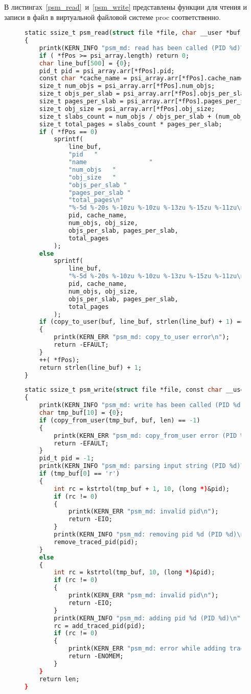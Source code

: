 В листингах~\ref{psm_read}~и~\ref{psm_write} представлены функции для чтения и записи в файл в виртуальной файловой системе proc соответственно.
\begin{figure}[H]
	\begin{lstlisting}[label=psm_read,caption=Функция psm\_read,language=Caml]
static ssize_t psm_read(struct file *file, char __user *buf, size_t len, loff_t *fPos)
{
	printk(KERN_INFO "psm_md: read has been called (PID %d)\n", current->pid);
	if ( *fPos >= psi_array.length) return 0;
	char line_buf[500] = {0};
	pid_t pid = psi_array.arr[*fPos].pid;
	const char *cache_name = psi_array.arr[*fPos].cache_name;
	size_t num_objs = psi_array.arr[*fPos].num_objs;
	size_t objs_per_slab = psi_array.arr[*fPos].objs_per_slab;
	size_t pages_per_slab = psi_array.arr[*fPos].pages_per_slab;
	size_t obj_size = psi_array.arr[*fPos].obj_size;
	size_t slabs_count = num_objs / objs_per_slab + (num_objs % objs_per_slab > 0);
	size_t total_pages = slabs_count * pages_per_slab;
	if ( *fPos == 0)
		sprintf(
			line_buf,
			"pid   "
			"name                 "
			"num_objs   "
			"obj_size   "
			"objs_per_slab "
			"pages_per_slab "
			"total_pages\n"
			"%-5d %-20s %-10zu %-10zu %-13zu %-15zu %-11zu\n",
			pid, cache_name,
			num_objs, obj_size,
			objs_per_slab, pages_per_slab,
			total_pages
		);
	else
		sprintf(
			line_buf,
			"%-5d %-20s %-10zu %-10zu %-13zu %-15zu %-11zu\n",
			pid, cache_name,
			num_objs, obj_size,
			objs_per_slab, pages_per_slab,
			total_pages
		);
	if (copy_to_user(buf, line_buf, strlen(line_buf) + 1) == -1)
	{
		printk(KERN_ERR "psm_md: copy_to_user error\n");
		return -EFAULT;
	}
	++( *fPos);
	return strlen(line_buf) + 1;
}
	\end{lstlisting}
\end{figure}
\begin{figure}[H]
	\begin{lstlisting}[label=psm_write,caption=Функция psm\_write,language=Caml]
static ssize_t psm_write(struct file *file, const char __user *buf, size_t len, loff_t *fPos)
{
	printk(KERN_INFO "psm_md: write has been called (PID %d)\n", current->pid);
	char tmp_buf[10] = {0};
	if (copy_from_user(tmp_buf, buf, len) == -1)
	{
		printk(KERN_ERR "psm_md: copy_from_user error (PID %d)\n", current->pid);
		return -EFAULT;
	}
	pid_t pid = -1;
	printk(KERN_INFO "psm_md: parsing input string (PID %d)\n", current->pid);
	if (tmp_buf[0] == 'r')
	{
		int rc = kstrtol(tmp_buf + 1, 10, (long *)&pid);
		if (rc != 0)
		{
			printk(KERN_ERR "psm_md: invalid pid\n");
			return -EIO;
		}
		printk(KERN_INFO "psm_md: removing pid %d (PID %d)\n", pid, current->pid);
		remove_traced_pid(pid);
	}
	else
	{
		int rc = kstrtol(tmp_buf, 10, (long *)&pid);
		if (rc != 0)
		{
			printk(KERN_ERR "psm_md: invalid pid\n");
			return -EIO;
		}
		printk(KERN_INFO "psm_md: adding pid %d (PID %d)\n", pid, current->pid);
		rc = add_traced_pid(pid);
		if (rc != 0)
		{
			printk(KERN_ERR "psm_md: error while adding traced pid\n");
			return -ENOMEM;
		}
	}
	return len;
}
	\end{lstlisting}
\end{figure}

